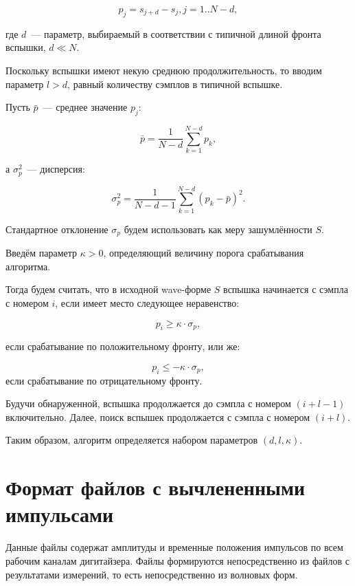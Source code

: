 \documentclass[12pt, a4paper, oneside, onecolumn]{book}
\begin{document}
$$
p_j = s_{j+d} - s_j, j = 1..N-d,
$$

\noindent где $d$~--- параметр, выбираемый в соответствии с типичной длиной фронта вспышки, $d \ll N$.

Поскольку вспышки имеют некую среднюю продолжительность, то вводим параметр $l > d$, равный количеству сэмплов в типичной вспышке. 

Пусть $\bar{p}$~--- среднее значение $p_j$:

$$
\bar{p} = \frac{1}{N-d} \sum_{k=1}^{N-d} p_k,
$$

\noindent а $\sigma_p^2$~--- дисперсия:

$$
\sigma_p^2 = \frac{1}{N-d-1} \sum_{k=1}^{N-d} \left( p_k - \bar{p} \right) ^2.
$$

Стандартное отклонение $\sigma_p$ будем использовать как меру зашумлённости $S$.

Введём параметр $\kappa > 0$, определяющий величину порога срабатывания алгоритма.

Тогда будем считать, что в исходной wave-форме $S$ вспышка начинается с сэмпла с номером $i$, если имеет место следующее неравенство:

\begin{equation}
p_i \ge \kappa \cdot \sigma_p,
\end{equation}

\noindent если срабатывание по положительному фронту, или же:

\begin{equation}
p_i \le -\kappa \cdot \sigma_p,
\end{equation}
\noindent если срабатывание по отрицательному фронту.

Будучи обнаруженной, вспышка продолжается до сэмпла с номером $(i + l - 1)$ включительно. Далее, поиск вспышек продолжается с сэмпла с номером $(i + l)$.

Таким образом, алгоритм определяется набором параметров $(d, l, \kappa)$.


\chapter{Формат файлов с вычлененными импульсами}
\label{sec_peaks_file_format}

\newcommand{\COLUMN}[1]{{\tt #1}}

Данные файлы содержат амплитуды и временные положения импульсов по всем рабочим каналам дигитайзера. Файлы формируются непосредственно из файлов с результатами измерений, то есть непосредственно из волновых форм.
\end{document}
